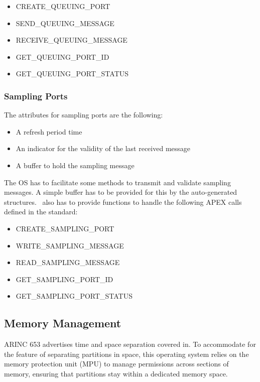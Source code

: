 \begin{itemize}
	\item CREATE\_QUEUING\_PORT
	\item SEND\_QUEUING\_MESSAGE
	\item RECEIVE\_QUEUING\_MESSAGE
	\item GET\_QUEUING\_PORT\_ID
	\item GET\_QUEUING\_PORT\_STATUS
\end{itemize}


\subsubsection{Sampling Ports}
\label{sssec:sampling_ports}
The attributes for sampling ports are the following:
\begin{itemize}
	\item A refresh period time
	\item An indicator for the validity of the last received message
	\item A buffer to hold the sampling message
\end{itemize}

The OS has to facilitate some methods to transmit and validate sampling messages.
A simple buffer has to be provided for this by the auto-generated structures.
\OSname\ also has to provide functions to handle the following APEX calls defined in the standard\cite{arinc_interpartition_comm}:

\begin{itemize}
	\item CREATE\_SAMPLING\_PORT
	\item WRITE\_SAMPLING\_MESSAGE
	\item READ\_SAMPLING\_MESSAGE
	\item GET\_SAMPLING\_PORT\_ID
	\item GET\_SAMPLING\_PORT\_STATUS
\end{itemize}


\subsection{Memory Management}
ARINC 653 advertises time and space separation covered in.
To accommodate for the feature of separating partitions in space,
this operating system relies on the memory protection unit (MPU)
to manage permissions across sections of memory,
ensuring that partitions stay within a dedicated memory space.\\

